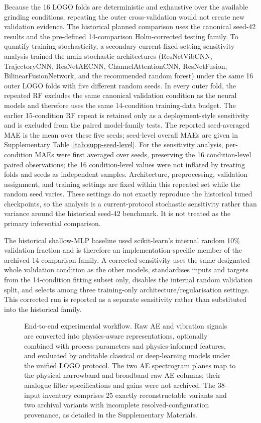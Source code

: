 Because the 16 LOGO folds are deterministic and exhaustive over the
available grinding conditions, repeating the outer cross-validation would
not create new validation evidence. The historical planned comparison uses
the canonical seed-42 results and the pre-defined 14-comparison
Holm-corrected testing family.  To quantify training stochasticity, a
secondary current fixed-setting sensitivity analysis trained the main stochastic architectures
(ResNetVibCNN, TrajectoryCNN, ResNetAECNN, ChannelAttentionCNN, ResNetFusion, BilinearFusionNetwork, and
the recommended random forest) under the same 16 outer LOGO folds with
five different random seeds. In every outer fold, the repeated RF excludes
the same canonical validation condition as the neural models and therefore
uses the same 14-condition training-data budget. The earlier 15-condition RF
repeat is retained only as a deployment-style sensitivity and is excluded
from the paired model-family tests. The reported seed-averaged MAE is the mean
over these five seeds; seed-level overall MAEs are given in
Supplementary Table~\ref{tab:supp-seed-level}.  For the sensitivity
analysis, per-condition MAEs were first averaged over seeds, preserving
the 16 condition-level paired observations; the 16 condition-level values
were not inflated by treating folds and seeds as independent samples.
Architecture, preprocessing, validation assignment, and training settings are
fixed within this repeated set while the random seed varies. These settings do
not exactly reproduce the historical tuned checkpoints, so the analysis is a
current-protocol stochastic sensitivity rather than variance around the
historical seed-42 benchmark. It is not treated as the primary inferential
comparison.

The historical shallow-MLP baseline used scikit-learn's internal random
10\% validation fraction and is therefore an implementation-specific member
of the archived 14-comparison family. A corrected sensitivity uses the same
designated whole validation condition as the other models, standardises inputs
and targets from the 14-condition fitting subset only, disables the internal
random validation split, and selects among three training-only
architecture/regularisation settings. This corrected run is reported as a
separate sensitivity rather than substituted into the historical family.

\begin{figure}[htbp]
\centering
\resizebox{\linewidth}{!}{}
\caption{End-to-end experimental workflow. Raw AE and vibration signals
are converted into physics-aware representations, optionally combined
with process parameters and physics-informed features, and evaluated by
auditable classical or deep-learning models under the unified LOGO protocol. The
two AE spectrogram planes map to the physical narrowband and broadband raw
AE columns; their analogue filter specifications and gains were not
archived. The 38-input inventory comprises 25 exactly reconstructable variants
and two archival variants with incomplete resolved-configuration provenance,
as detailed in the Supplementary Materials.}
\label{fig:workflow}
\end{figure}

